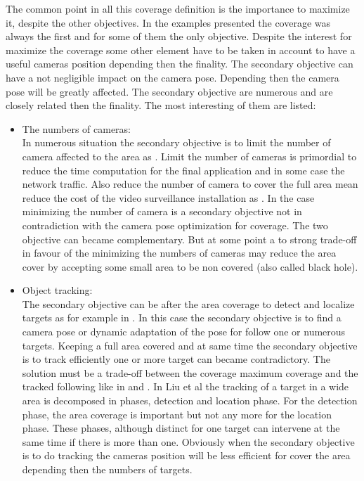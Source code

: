 The common point in all this coverage definition is the importance to maximize it, despite the other objectives. In the examples presented the coverage was always the first and for some of them the only objective. Despite the interest for maximize the coverage some other element have to be taken in account to have a useful cameras position depending then the finality. The secondary objective can have a not negligible impact on the camera pose. Depending then the camera pose will be greatly affected. The secondary objective are numerous and are closely related then the finality. The most interesting of them are listed:\\
\begin{itemize}
\item  The numbers of cameras: \\ In numerous situation the secondary objective is to limit the number of camera affected to the area as \cite{151*zhao2013,171*horster2006,22*zhao2008}. Limit the number of cameras is primordial to reduce the time computation for the final application and in some case the network traffic. Also reduce the number of camera to cover the full area mean reduce the cost of the video surveillance installation as \cite{82*chrysostomou2012}. In the case  minimizing the number of camera is a secondary objective not in contradiction with the camera pose optimization for coverage. The two objective can became complementary. But at some point a to strong trade-off in favour of the minimizing the numbers of cameras may reduce the area cover by accepting some small area  to be non covered (also called black hole). \\

\item Object tracking: \\ The secondary objective can be after the area coverage to detect and localize targets as for example in \cite{18*ding2012,12*soto2009,23*liu2009,39*wu2011,40*sohrabi2000,22*zhao2008}. In this case the secondary objective is to find a camera pose or dynamic adaptation of the pose for follow one or numerous targets. Keeping a full area covered and at same time the secondary objective is to track efficiently one or more target can became contradictory. The solution must be a trade-off between the coverage maximum coverage and the tracked following like in \cite{18*ding2012} and \cite{38*liu2010}. In Liu et al \cite{38*liu2010} the tracking of a target in a wide area is decomposed in phases, detection and location phase. For the detection phase, the area coverage is important but not any more for the location phase. These phases, although distinct for one target can intervene at the same time if there is more than one. Obviously when the secondary objective is to do tracking the cameras position will be less efficient for cover the area depending then the numbers of targets.  \\


\end{itemize}
